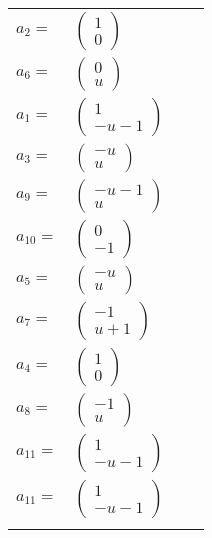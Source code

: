 \documentclass[1p]{elsarticle_modified}
\theoremstyle{definition}
\begin{document}
\begin{tabular}{m{7pt} m{180pt} m{7pt} m{180pt} }
\flushright $a_{2}=$&$\begin{pmatrix}1\\0\end{pmatrix}$ \\
\flushright $a_{6}=$&$\begin{pmatrix}0\\u\end{pmatrix}$ \\
\flushright $a_{1}=$&$\begin{pmatrix}1\\- u-1\end{pmatrix}$ \\
\flushright $a_{3}=$&$\begin{pmatrix}- u\\u\end{pmatrix}$ \\
\flushright $a_{9}=$&$\begin{pmatrix}- u-1\\u\end{pmatrix}$ \\
\flushright $a_{10}=$&$\begin{pmatrix}0\\-1\end{pmatrix}$ \\
\flushright $a_{5}=$&$\begin{pmatrix}- u\\u\end{pmatrix}$ \\
\flushright $a_{7}=$&$\begin{pmatrix}-1\\u+1\end{pmatrix}$ \\
\flushright $a_{4}=$&$\begin{pmatrix}1\\0\end{pmatrix}$ \\
\flushright $a_{8}=$&$\begin{pmatrix}-1\\u\end{pmatrix}$ \\
\flushright $a_{11}=$&$\begin{pmatrix}1\\- u-1\end{pmatrix}$\\ \flushright $a_{11}=$&$\begin{pmatrix}1\\- u-1\end{pmatrix}$\\&\end{tabular}
\end{document}
